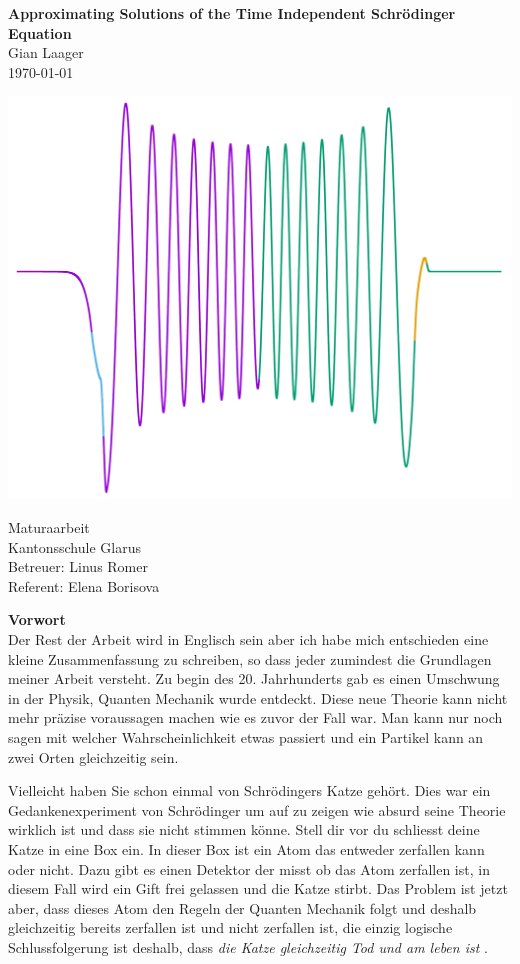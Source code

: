 \documentclass[11pt,DIV=10,final]{scrreprt} %
\begin{document}
\begin{titlepage}
\mbox{}\vspace{0.1\textheight}
\begin{center}
\textbf{\Huge Approximating Solutions of the Time Independent Schrödinger Equation}\\[3ex]
Gian Laager\\
\today
\vspace{0.05\textheight}
\begin{center}
	\includegraphics[width=.7\textwidth]{plots/wave_func_square.pdf}
\end{center}
\vspace{0.05\textheight}
Maturaarbeit\\
Kantonsschule Glarus\\
Betreuer: Linus Romer\\
Referent: Elena Borisova
\end{center}
\end{titlepage}


\tableofcontents

\pagebreak[4]

{\noindent \bfseries \Huge Vorwort}
\\[3ex]
Der Rest der Arbeit wird in Englisch sein aber ich habe mich entschieden eine kleine Zusammenfassung zu schreiben, so dass jeder zumindest die Grundlagen meiner Arbeit versteht.
Zu begin des 20. Jahrhunderts gab es einen Umschwung in der Physik, Quanten Mechanik wurde entdeckt. Diese neue Theorie kann nicht mehr präzise voraussagen machen wie es zuvor der Fall war.
Man kann nur noch sagen mit welcher Wahrscheinlichkeit etwas passiert und ein Partikel kann an zwei Orten gleichzeitig sein.

Vielleicht haben Sie schon einmal von Schrödingers Katze gehört. Dies war ein Gedankenexperiment von Schrödinger um auf zu zeigen wie absurd seine Theorie wirklich ist und dass sie nicht stimmen könne.
Stell dir vor du schliesst deine Katze in eine Box ein. In dieser Box ist ein Atom das entweder zerfallen kann oder nicht. Dazu gibt es einen Detektor der misst ob das Atom zerfallen ist, in diesem Fall
wird ein Gift frei gelassen und die Katze stirbt.
Das Problem ist jetzt aber, dass dieses Atom den Regeln der Quanten Mechanik folgt und deshalb gleichzeitig bereits zerfallen ist und nicht zerfallen ist, die einzig logische Schlussfolgerung ist deshalb,
dass \emph{die Katze gleichzeitig Tod und am leben ist} \citep{schrodinger1935gegenwartige}.
\end{document}
